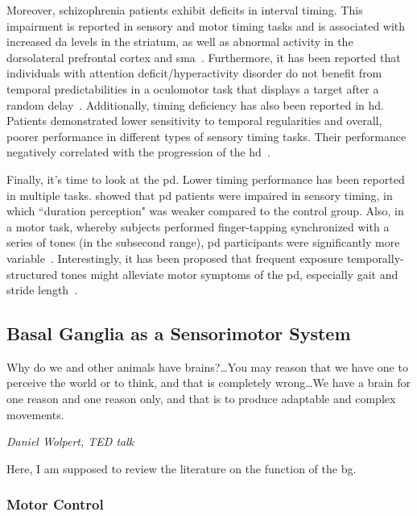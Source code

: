 Moreover, schizophrenia patients exhibit deficits in interval timing.
This impairment is reported in sensory and motor timing tasks and is associated with increased \gls{da} levels in the striatum, as well as abnormal activity in the dorsolateral prefrontal cortex and \gls{sma}~\cite[see][]{Snowden2019}.
Furthermore, it has been reported that individuals with attention deficit/hyperactivity disorder do not benefit from temporal predictabilities in a oculomotor task that displays a target after a random delay~\cite{Dankner2017}.
Additionally, timing deficiency has also been reported in \gls{hd}.
Patients demonstrated lower sensitivity to temporal regularities and overall, poorer performance in different types of sensory timing tasks.
Their performance negatively correlated with the progression of the \gls{hd}~\cite{Cope2014}.
\par
Finally, it's time to look at the \gls{pd}.\footnotemark
{}
Lower timing performance has been reported in multiple tasks.
 showed that \gls{pd} patients were impaired in sensory timing, in which ``duration perception" was weaker compared to the control group.
Also, in a motor task, whereby subjects performed finger-tapping synchronized with a series of tones (in the subsecond range), \gls{pd} participants were significantly more variable~\cite{Harrington1998}.
Interestingly, it has been proposed that frequent exposure temporally-structured tones might alleviate motor symptoms of the \gls{pd}, especially gait and stride length~\cite{Dalla2017}.



\subsection{Basal Ganglia as a Sensorimotor System}
\label{intro:BGMotor}
\epigraph{Why do we and other animals have brains?\ldots You may reason that we have one to perceive the world or to think, and that is completely wrong\ldots We have a brain for one reason and one reason only, and that is to produce adaptable and complex movements.}
{\textit{Daniel Wolpert, TED talk}}
\noindent

Here, I am supposed to review the literature on the function of the \gls{bg}.

\subsubsection{Motor Control} \label{intro:motorControl}
